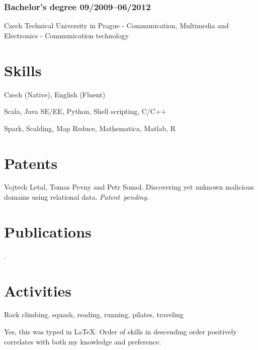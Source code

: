 \documentclass[10pt]{article}
\begin{document}
\subsubsection*{\bf Bachelor’s degree \hfill 09/2009--06/2012}
\vspace{-1.5mm}
Czech Technical University in Prague - Communication, Multimedia and Electronics - Communication technology

\section*{Skills}
\begin{description}
	\setlength\itemsep{0.05em}
	\item[Languages] Czech (Native), English (Fluent)
	\item[Programming]  Scala, Java SE/EE, Python, Shell scripting, C/C++
	\item[Analytics]  Spark, Scalding, Map Reduce, Mathematica, Matlab, R
\end{description}

\section*{Patents}
Vojtech Letal, Tomas Pevny and Petr Somol. Discovering yet unknown malicious domains using relational data. {\it Patent~pending.}



\section*{Publications}
.

\section*{Activities}
Rock climbing, squash, reading, running, pilates, traveling


{\vfill
\scriptsize\hfill Yes, this was typed in \LaTeX. Order of skills in descending order positively correlates with both my knowledge and preference.}

\end{document}
